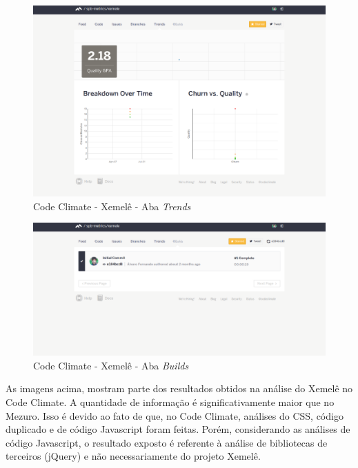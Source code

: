 \begin{figure}[!htb]
	\centering
    \includegraphics[keepaspectratio=true,scale=0.3]
    {figuras/codeclimate_trends_tab.eps}
  \caption{Code Climate - Xemelê - Aba \textit{Trends}}
	\label{fig:codeclimate_trends_tab}
\end{figure}

\begin{figure}[!htb]
	\centering
    \includegraphics[keepaspectratio=true,scale=0.3]
    {figuras/codeclimate_builds_tab.eps}
  \caption{Code Climate - Xemelê - Aba \textit{Builds}}
	\label{fig:codeclimate_builds_tab}
\end{figure}


As imagens acima, mostram parte dos resultados obtidos na análise do Xemelê no
Code Climate. A quantidade de informação é significativamente maior que no Mezuro.
Isso é devido ao fato de que, no Code Climate, análises do CSS, código duplicado
e de código Javascript foram feitas. Porém, considerando as análises de código
Javascript, o resultado exposto é referente à análise de bibliotecas de
terceiros (jQuery) e não necessariamente do projeto Xemelê.

